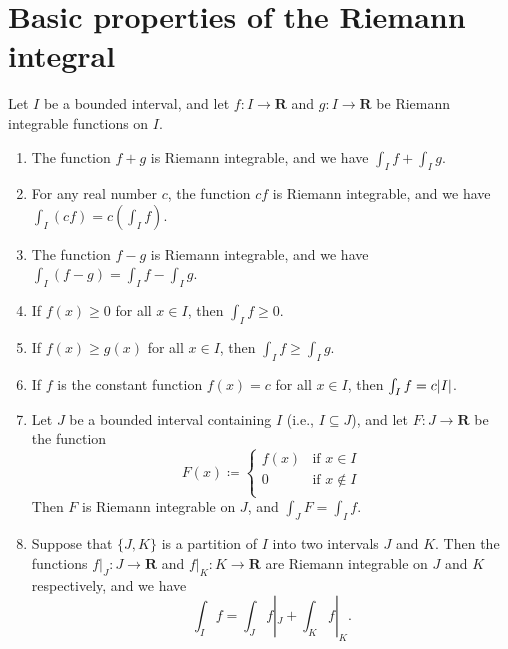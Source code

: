\section{Basic properties of the Riemann integral}\label{sec 11.4}

\begin{theorem}\label{11.4.1}
    Let \(I\) be a bounded interval, and let \(f : I \to \mathbf{R}\) and \(g : I \to \mathbf{R}\) be Riemann integrable functions on \(I\).
    \begin{enumerate}
        \item The function \(f + g\) is Riemann integrable, and we have \(\int_I f + \int_I g\).
        \item For any real number \(c\), the function \(cf\) is Riemann integrable, and we have \(\int_I (cf) = c(\int_I f)\).
        \item The function \(f - g\) is Riemann integrable, and we have \(\int_I (f - g) = \int_I f - \int_I g\).
        \item If \(f(x) \geq 0\) for all \(x \in I\), then \(\int_I f \geq 0\).
        \item If \(f(x) \geq g(x)\) for all \(x \in I\), then \(\int_I f \geq \int_I g\).
        \item If \(f\) is the constant function \(f(x) = c\) for all \(x \in I\), then \(\int_I f = c \abs*{I}\).
        \item Let \(J\) be a bounded interval containing \(I\) (i.e., \(I \subseteq J\)), and let \(F : J \to \mathbf{R}\) be the function
              \[
                  F(x) \coloneqq \begin{cases}
                      f(x) & \text{if } x \in I    \\
                      0    & \text{if } x \notin I \\
                  \end{cases}
              \]
              Then \(F\) is Riemann integrable on \(J\), and \(\int_J F = \int_I f\).
        \item Suppose that \(\{J, K\}\) is a partition of \(I\) into two intervals \(J\) and \(K\).
              Then the functions \(f|_J : J \to \mathbf{R}\) and \(f|_K : K \to \mathbf{R}\) are Riemann integrable on \(J\) and \(K\) respectively, and we have
              \[
                  \int_I f = \int_J f|_J + \int_K f|_K.
              \]
    \end{enumerate}
\end{theorem}

